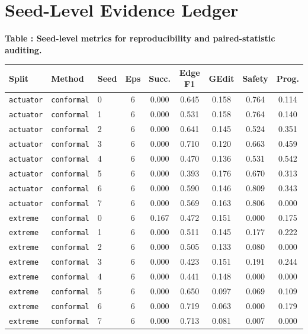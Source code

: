 \documentclass{article}
\begin{document}
\section{Seed-Level Evidence Ledger}
\tiny
\begin{center}
\label{tab:seedledger}\textbf{Table \thetable: Seed-level metrics for reproducibility and paired-statistic auditing.}\\[0.4ex]
\begin{tabular}{lllcccccc}
\toprule
Split & Method & Seed & Eps & Succ. & Edge F1 & GEdit & Safety & Prog. \\
\midrule
\texttt{actuator} & \texttt{conformal} & 0 & 6 & 0.000 & 0.645 & 0.158 & 0.764 & 0.114 \\
\texttt{actuator} & \texttt{conformal} & 1 & 6 & 0.000 & 0.531 & 0.158 & 0.764 & 0.140 \\
\texttt{actuator} & \texttt{conformal} & 2 & 6 & 0.000 & 0.641 & 0.145 & 0.524 & 0.351 \\
\texttt{actuator} & \texttt{conformal} & 3 & 6 & 0.000 & 0.710 & 0.120 & 0.663 & 0.459 \\
\texttt{actuator} & \texttt{conformal} & 4 & 6 & 0.000 & 0.470 & 0.136 & 0.531 & 0.542 \\
\texttt{actuator} & \texttt{conformal} & 5 & 6 & 0.000 & 0.393 & 0.176 & 0.670 & 0.313 \\
\texttt{actuator} & \texttt{conformal} & 6 & 6 & 0.000 & 0.590 & 0.146 & 0.809 & 0.343 \\
\texttt{actuator} & \texttt{conformal} & 7 & 6 & 0.000 & 0.569 & 0.163 & 0.806 & 0.000 \\
\texttt{extreme} & \texttt{conformal} & 0 & 6 & 0.167 & 0.472 & 0.151 & 0.000 & 0.175 \\
\texttt{extreme} & \texttt{conformal} & 1 & 6 & 0.000 & 0.511 & 0.145 & 0.177 & 0.222 \\
\texttt{extreme} & \texttt{conformal} & 2 & 6 & 0.000 & 0.505 & 0.133 & 0.080 & 0.000 \\
\texttt{extreme} & \texttt{conformal} & 3 & 6 & 0.000 & 0.423 & 0.151 & 0.191 & 0.244 \\
\texttt{extreme} & \texttt{conformal} & 4 & 6 & 0.000 & 0.441 & 0.148 & 0.000 & 0.000 \\
\texttt{extreme} & \texttt{conformal} & 5 & 6 & 0.000 & 0.650 & 0.097 & 0.069 & 0.109 \\
\texttt{extreme} & \texttt{conformal} & 6 & 6 & 0.000 & 0.719 & 0.063 & 0.000 & 0.179 \\
\texttt{extreme} & \texttt{conformal} & 7 & 6 & 0.000 & 0.713 & 0.081 & 0.007 & 0.000 \\

\end{tabular}
\end{center}
\end{document}
